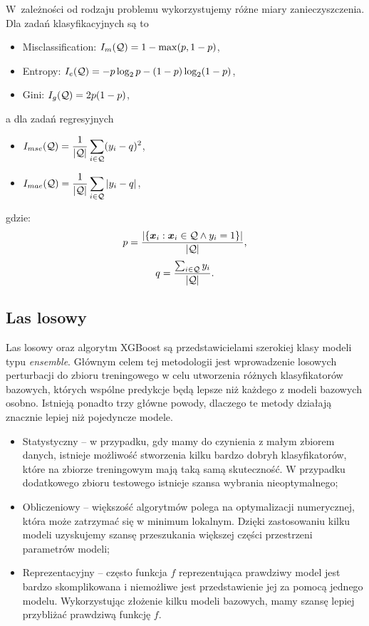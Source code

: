 \documentclass[inzynierska]{pwr_wmat_praca_dyplomowa}
\theoremstyle{plain}
\numberwithin{theorem}{chapter}
\theoremstyle{definition}
\numberwithin{theorem}{chapter}
\begin{document}
W~zależności od rodzaju problemu wykorzystujemy różne miary zanieczyszczenia. Dla zadań klasyfikacyjnych są to
\begin{itemize}
	\item Misclassification: $I_m(\mathcal{Q}) = 1 - \max(p, 1 - p)$,
	\item Entropy: $I_e(\mathcal{Q}) = -p \log_2 p - (1 - p) \log_2(1 - p)$,
	\item Gini: $I_g(\mathcal{Q}) = 2p(1 - p)$,
\end{itemize}{}
a dla zadań regresyjnych
\begin{itemize}
	\item $ \displaystyle I_{mse}(\mathcal{Q}) = \frac{1}{|\mathcal{Q}|} \sum_{i \in \mathcal{Q}} (y_i - q)^2$,
	\item $ \displaystyle I_{mae}(\mathcal{Q}) = \frac{1}{|\mathcal{Q}|} \sum_{i \in \mathcal{Q}} |y_i - q|$,
\end{itemize}
gdzie:
$$ p = \frac{| \{ \boldsymbol{x}_i : \boldsymbol{x}_i \in \mathcal{Q} \land y_i = 1 \}|}{|\mathcal{Q}|} \text{,} $$
$$ q = \frac{\sum_{i \in \mathcal{Q}} y_i}{|\mathcal{Q}|} \text{.} $$

\subsection{Las losowy}
Las losowy oraz algorytm XGBoost są przedstawicielami szerokiej klasy modeli typu \textit{ensemble}. Głównym celem tej metodologii jest wprowadzenie losowych perturbacji do zbioru treningowego w celu utworzenia różnych klasyfikatorów bazowych, których wspólne predykcje będą lepsze niż każdego z modeli bazowych osobno. Istnieją ponadto trzy główne powody, dlaczego te metody działają znacznie lepiej niż pojedyncze modele.
\begin{itemize}
	\item Statystyczny -- w przypadku, gdy mamy do czynienia z małym zbiorem danych, istnieje możliwość stworzenia kilku bardzo dobryh klasyfikatorów, które na zbiorze treningowym mają taką samą skuteczność. W przypadku dodatkowego zbioru testowego istnieje szansa wybrania nieoptymalnego;
	\item Obliczeniowy -- większość algorytmów polega na optymalizacji numerycznej, która może zatrzymać się w minimum lokalnym. Dzięki zastosowaniu kilku modeli uzyskujemy szansę przeszukania większej części przestrzeni parametrów modeli;
	\item Reprezentacyjny -- często funkcja $f$ reprezentująca prawdziwy model jest bardzo skomplikowana i niemożliwe jest przedstawienie jej za pomocą jednego modelu. Wykorzystując złożenie kilku modeli bazowych, mamy szansę lepiej przybliżać prawdziwą funkcję $f$.
\end{itemize}
\end{document}
